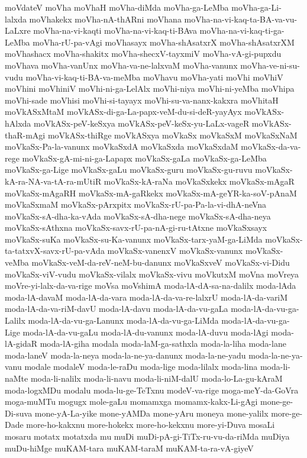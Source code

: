 {moVdateV
moVha
moVhaH
moVha-diMda
moVha-ga-LeMba
moVha-ga-Li-lalxda
moVhakekx
moVha-nA-thARni
moVhana
moVha-na-vi-kaq-ta-BA-va-vu-LaLxre
moVha-na-vi-kaqti
moVha-na-vi-kaq-ti-BAva
moVha-na-vi-kaq-ti-ga-LeMba
moVha-rU-pa-vAgi
moVhasayx
moVha-shAsatxrX
moVha-shAsatxrXM
moVhashacx
moVha-shakitx
moVha-shecxV-tayxmiV
moVha-vA-gi-pupxdu
moVhava
moVha-vanUnx
moVha-va-ne-lalxvaM
moVha-vanunx
moVha-ve-ni-su-vudu
moVha-vi-kaq-ti-BA-va-meMba
moVhavu
moVha-yati
moVhi
moVhiV
moVhini
moVhiniV
moVhi-ni-ga-LelAlx
moVhi-niya
moVhi-ni-yeMba
moVhipa
moVhi-sade
moVhisi
moVhi-si-tayayx
moVhi-su-va-nanx-kakxra
moVhitaH
moVkASxMtaM
moVkASx-di-ga-La-papx-veM-du-si-deR-yayAyx
moVkASx-hAlxda
moVkASx-peV-keSxya
moVkASx-peV-keSx-yu-LaLx-vageR
moVkASx-thaR-mAgi
moVkASx-thiRge
moVkASxya
moVkaSx
moVkaSxM
moVkaSxNaM
moVkaSx-Pa-la-vanunx
moVkaSxdA
moVkaSxda
moVkaSxdaM
moVkaSx-da-va-rege
moVkaSx-gA-mi-ni-ga-Lapapx
moVkaSx-gaLa
moVkaSx-ga-LeMba
moVkaSx-ga-Lige
moVkaSx-gaLu
moVkaSx-guru
moVkaSx-gu-ruvu
moVkaSx-kA-ra-NA-va-tA-ra-mUtiR
moVkaSx-kA-raNa
moVkaSxkekx
moVkaSx-mAgaR
moVkaSx-mAgaRH
moVkaSx-mA-gaRkekx
moVkaSx-mA-geYR-ka-soV-pAnaM
moVkaSxmaM
moVkaSx-pArxpitx
moVkaSx-rU-pa-Pa-la-vi-dhA-neVna
moVkaSx-sA-dha-ka-vAda
moVkaSx-sA-dha-nege
moVkaSx-sA-dha-neya
moVkaSx-sAthxna
moVkaSx-savx-rU-pa-nA-gi-ru-tAtxne
moVkaSxsayx
moVkaSx-suKa
moVkaSx-su-Ka-vanunx
moVkaSx-tarx-yaM-ga-LiMda
moVkaSx-ta-tatxvX-savx-rU-pa-vAda
moVkaSx-vanenxV
moVkaSx-vanunx
moVkaSx-veMba
moVkaSx-veM-da-reV-neM-bu-danunx
moVkaSxveV
moVkaSx-vi-Didu
moVkaSx-viV-vudu
moVkaSx-vilalx
moVkaSx-vivu
moVkutxM
moVna
moVreya
moVre-yi-lalx-da-va-rige
moVsa
moVshimA
moda-lA-dA-sa-na-dalilx
moda-lAda
moda-lA-davaM
moda-lA-da-vara
moda-lA-da-va-re-lalxrU
moda-lA-da-variM
moda-lA-da-va-riM-davU
moda-lA-davu
moda-lA-da-vu-gaLa
moda-lA-da-vu-ga-Lalilx
moda-lA-da-vu-ga-Lanunx
moda-lA-da-vu-ga-LiMda
moda-lA-da-vu-ga-Lige
moda-lA-da-vu-gaLu
moda-lA-du-vanunx
moda-lA-duvu
moda-lAgi
moda-lA-gidaR
moda-lA-giha
modala
moda-laM-ga-sathxla
moda-la-liha
moda-lane
moda-laneV
moda-la-neya
moda-la-ne-ya-danunx
moda-la-ne-yadu
moda-la-ne-ya-vanu
modale
modaleV
moda-le-raDu
moda-lige
moda-lilalx
moda-lina
moda-li-naMte
moda-li-nalilx
moda-li-navu
moda-li-niM-dalU
moda-lo-La-gu-kAraM
moda-logxMDu
modalu
moda-lu-ge-TeTxnu
modeV-va-rige
moga-meY-da-GoVra
moga-muMTu
mogugx
mole-gaLu
momamxga
momamx-kakx-Li-gAgi
mone-ge-Di-suva
mone-yA-La-yike
mone-yAMDa
mone-yAru
moneya
mone-yalilx
more-ge-Dade
more-ho-kakxnu
more-hokekx
more-ho-kekxnu
more-yi-Duva
mosaLi
mosaru
motatx
motatxda
mu
muDi
muDi-pA-gi-TiTx-ru-vu-da-riMda
muDiya
muDu-hiMge
muKAM-tara
muKAM-taraM
muKAM-ta-ra-vA-giyeV
}
